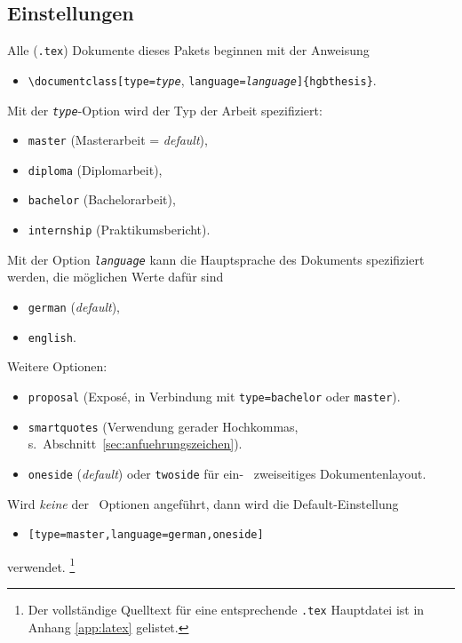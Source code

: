 \subsection{Einstellungen}
\label{sec:HagenbergEinstellungen}

Alle (\verb!.tex!) Dokumente dieses Pakets beginnen mit der Anweisung
%
\begin{itemize}
    \item[] \verb!\documentclass[!\texttt{type=\emph{type}},%
    \texttt{language=\emph{language}}\verb!]{hgbthesis}!.
\end{itemize}
%
Mit der \texttt{\emph{type}}-Option wird der Typ der Arbeit spezifiziert:
%
\begin{itemize}
	\item[] \texttt{master} (Masterarbeit = \emph{default}),
	\item[] \texttt{diploma} (Diplomarbeit),
	\item[] \texttt{bachelor} (Bachelorarbeit),
	\item[] \texttt{internship} (Praktikumsbericht).
\end{itemize}
%
Mit der Option \texttt{\emph{language}} kann die Hauptsprache des Dokuments
spezifiziert werden, die möglichen Werte dafür sind
%
\begin{itemize}
	\item[] \texttt{german} (\emph{default}),
	\item[] \texttt{english}.
\end{itemize}
%
Weitere Optionen:
%
\begin{itemize}
	\item[] \texttt{proposal} (Exposé, in Verbindung mit \texttt{type=bachelor} 
		oder \texttt{master}).
	\item[] \texttt{smartquotes} (Verwendung gerader Hochkommas,
		s.\ Abschnitt~\ref{sec:anfuehrungszeichen}).
	\item[] \texttt{oneside} (\emph{default}) oder \texttt{twoside} für 
		ein- \bzw\ zweiseitiges Dokumentenlayout.
\end{itemize}
%
Wird \emph{keine} der \oa\ Optionen angeführt, dann wird die Default-Einstellung
\begin{itemize}
	\item[] \texttt{[type=master,language=german,oneside]} %
\end{itemize}
verwendet.%
\footnote{Der vollständige Quelltext für eine entsprechende
\texttt{.tex} Hauptdatei ist in Anhang \ref{app:latex} gelistet.}

